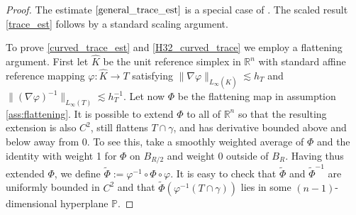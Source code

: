 \begin{proof}
The estimate $\eqref{general_trace_est}$ is a special case of \cite[Lemma 5.19]{Ad75}.  The scaled result \eqref{trace_est} follows by a standard scaling argument.  

To prove \eqref{curved_trace_est} and \eqref{H32_curved_trace} we employ a flattening argument.  First let $\hat{K}$ be the unit reference simplex in $\mathbb{R}^n$ with standard affine reference mapping $\varphi: \hat{K} \rightarrow T$ satisfying $\|\nabla \varphi\|_{L_\infty(\hat K)} \lesssim h_T$ and $\|(\nabla \varphi)^{-1}\|_{L_\infty(T)} \lesssim h_T^{-1}$.  Let now $\Phi$ be the flattening map in assumption \eqref{ass:flattening}.  It is possible to extend $\Phi$ to all of $\mathbb{R}^n$ so that the resulting extension is also $C^2$, still flattens $T \cap \gamma$, and has derivative bounded above and below away from 0.  To see this, take a smoothly weighted average of $\Phi$ and the identity with weight 1 for $\Phi$ on $B_{R/2}$ and weight 0 outside of $B_R$.  Having thus extended $\Phi$, we define $\widetilde\Phi:=\varphi^{-1} \circ \Phi \circ \varphi$.  It is easy to check that $\widetilde\Phi$ and $\widetilde\Phi^{-1}$ are uniformly bounded in $C^2$ and that $\widetilde\Phi(\varphi^{-1} (T \cap \gamma))$ lies in some $(n-1)$-dimensional hyperplane $\mathbb{P}$.


\end{proof}
